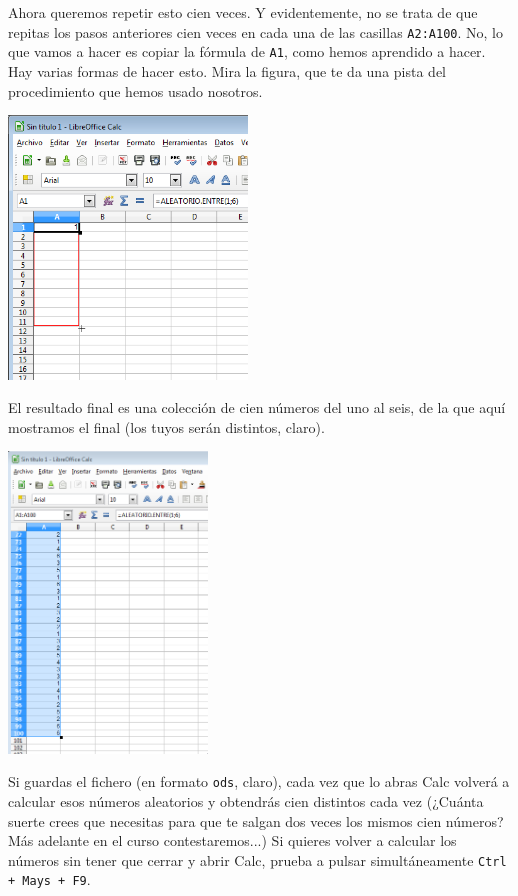 \documentclass[10pt,a4paper]{article}\usepackage[]{graphicx}\usepackage[]{color}
\newcounter {cont01}
\begin{document}
Ahora queremos repetir esto cien veces. Y evidentemente, no se trata de que repitas los pasos anteriores cien veces en cada una de las casillas {\tt A2:A100}. No, lo que vamos a hacer es copiar la fórmula de {\tt A1}, como hemos aprendido a hacer. Hay varias formas de hacer esto. Mira la figura, que te da una pista del procedimiento que hemos usado nosotros.
    \begin{center}
    \includegraphics[height=7cm]{../fig/Tut01-Calc-Formula-12.png}
    \end{center}
El resultado final es una colección de cien números del uno al seis, de la que aquí mostramos el final (los tuyos serán distintos, claro).
    \begin{center}
    \includegraphics[height=8cm]{../fig/Tut01-Calc-Formula-13.png}
    \end{center}
Si guardas el fichero (en formato {\tt ods}, claro), cada vez que lo abras Calc volverá a calcular esos números aleatorios y obtendrás cien distintos cada vez (¿Cuánta suerte crees que necesitas para que te salgan dos veces los mismos cien números?
Más adelante en el curso contestaremos...) Si quieres volver a calcular los números sin tener que cerrar y abrir Calc, prueba a pulsar simultáneamente {\tt Ctrl + Mays + F9}.
\end{document}
